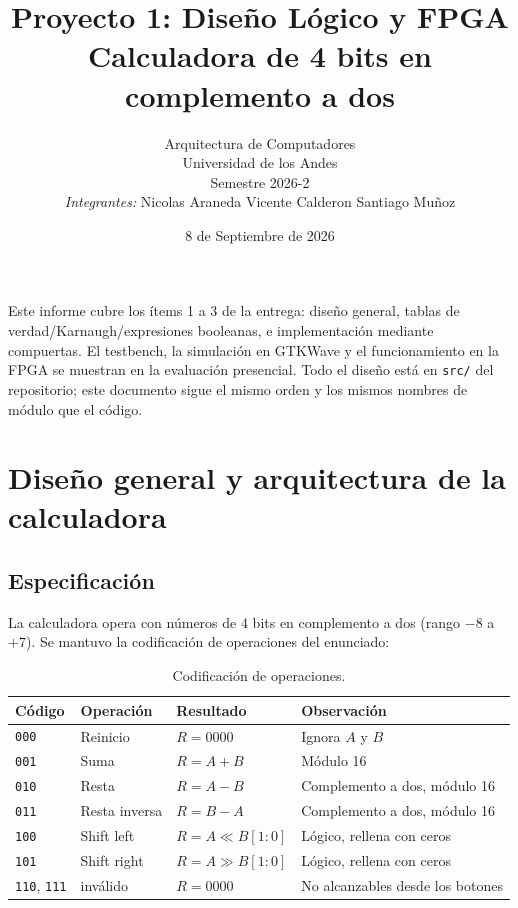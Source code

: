 \documentclass[11pt,a4paper]{article}
\title{\textbf{Proyecto 1: Diseño Lógico y FPGA}\\[4pt]\Large Calculadora de 4 bits en complemento a dos}
\author{Arquitectura de Computadores \\ Universidad de los Andes \\ Semestre 2026-2 \\[6pt] \textit{Integrantes:} Nicolas Araneda \quad Vicente Calderon \quad Santiago Muñoz}
\date{8 de Septiembre de 2026}
\newcommand{\bit}[1]{\texttt{#1}}
\newcommand{\sig}[1]{\texttt{#1}}
\begin{document}
\maketitle

Este informe cubre los ítems 1 a 3 de la entrega: diseño general, tablas de verdad/Karnaugh/expresiones booleanas, e implementación mediante compuertas. El testbench, la simulación en GTKWave y el funcionamiento en la FPGA se muestran en la evaluación presencial. Todo el diseño está en \sig{src/} del repositorio; este documento sigue el mismo orden y los mismos nombres de módulo que el código.

\tableofcontents
\newpage

\section{Diseño general y arquitectura de la calculadora}

\subsection{Especificación}

La calculadora opera con números de 4 bits en complemento a dos (rango $-8$ a $+7$). Se mantuvo la codificación de operaciones del enunciado:

\begin{table}[H]
\centering
\begin{tabular}{@{}llll@{}}
\toprule
\textbf{Código} & \textbf{Operación} & \textbf{Resultado} & \textbf{Observación} \\
\midrule
\bit{000} & Reinicio      & $R = 0000$              & Ignora $A$ y $B$ \\
\bit{001} & Suma          & $R = A + B$             & Módulo 16 \\
\bit{010} & Resta         & $R = A - B$             & Complemento a dos, módulo 16 \\
\bit{011} & Resta inversa & $R = B - A$             & Complemento a dos, módulo 16 \\
\bit{100} & Shift left    & $R = A \ll B[1{:}0]$    & Lógico, rellena con ceros \\
\bit{101} & Shift right   & $R = A \gg B[1{:}0]$    & Lógico, rellena con ceros \\
\bit{110}, \bit{111} & inválido & $R = 0000$         & No alcanzables desde los botones \\
\bottomrule
\end{tabular}
\caption{Codificación de operaciones.}
\end{table}
\end{document}
